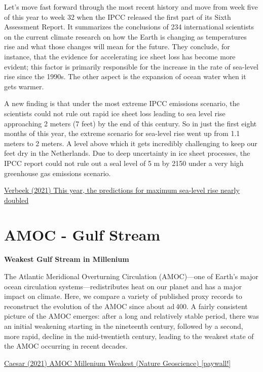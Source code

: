 \documentclass[
]{book}
\begin{document}
Let's move fast forward through the most recent history and move from week five of this year to week 32 when the IPCC released the first part of its Sixth Assessment Report. It summarizes the conclusions of 234 international scientists on the current climate research on how the Earth is changing as temperatures rise and what those changes will mean for the future. They conclude, for instance, that the evidence for accelerating ice sheet loss has become more evident; this factor is primarily responsible for the increase in the rate of sea-level rise since the 1990s. The other aspect is the expansion of ocean water when it gets warmer.

A new finding is that under the most extreme IPCC emissions scenario, the scientists could not rule out rapid ice sheet loss leading to sea level rise approaching 2 meters (7 feet) by the end of this century. So in just the first eight months of this year, the extreme scenario for sea-level rise went up from 1.1 meters to 2 meters. A level above which it gets incredibly challenging to keep our feet dry in the Netherlands. Due to deep uncertainty in ice sheet processes, the IPCC report could not rule out a seal level of 5 m by 2150 under a very high greenhouse gas emissions scenario.

\href{https://theplanet.substack.com/p/this-year-the-predictions-for-maximum}{Verbeek (2021) This year, the predictions for maximum sea-level rise nearly doubled}

\hypertarget{amoc---gulf-stream}{%
\section{AMOC - Gulf Stream}\label{amoc---gulf-stream}}

\textbf{Weakest Gulf Stream in Millenium}

The Atlantic Meridional Overturning Circulation (AMOC)---one of Earth's major ocean circulation systems---redistributes heat on our planet and has a major impact on climate. Here, we compare a variety of published proxy records to reconstruct the evolution of the AMOC since about ad 400. A fairly consistent picture of the AMOC emerges: after a long and relatively stable period, there was an initial weakening starting in the nineteenth century, followed by a second, more rapid, decline in the mid-twentieth century, leading to the weakest state of the AMOC occurring in recent decades.

\href{https://www.nature.com/articles/s41561-021-00699-z}{Caesar (2021) AMOC Millenium Weakest (Nature Geoscience) {[}paywall!{]}}
\end{document}
